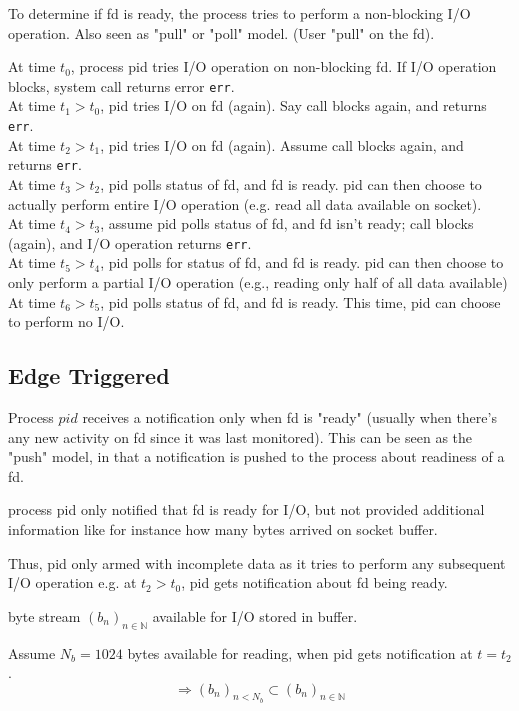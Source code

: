 \documentclass[10pt]{amsart}
\begin{document}
To determine if fd is ready, the process tries to perform a non-blocking I/O operation. Also seen as "pull" or "poll" model. (User "pull" on the fd).

At time $t_0$, process pid tries I/O operation on non-blocking fd. If I/O operation blocks, system call returns error \texttt{err}. \\
At time $t_1 > t_0$, pid tries I/O on fd (again). Say call blocks again, and returns \texttt{err}. \\
At time $t_2 > t_1$, pid tries I/O on fd (again). Assume call blocks again, and returns \texttt{err}. \\
At time $t_3 > t_2$, pid polls status of fd, and fd is ready. pid can then choose to actually perform entire I/O operation (e.g. read all data available on socket). \\
At time $t_4 > t_3$, assume pid polls status of fd, and fd isn't ready; call blocks (again), and I/O operation returns \texttt{err}. \\
At time $t_5 > t_4$, pid polls for status of fd, and fd is ready. pid can then choose to only perform a partial I/O operation (e.g., reading only half of all data available) \\
At time $t_6 > t_5$, pid polls status of fd, and fd is ready. This time, pid can choose to perform no I/O.

\subsection{Edge Triggered}

Process $pid$ receives a notification only when fd is "ready" (usually when there's any new activity on fd since it was last monitored). This can be seen as the "push" model, in that a notification is pushed to the process about readiness of a fd.

process pid only notified that fd is ready for I/O, but not provided additional information like for instance how many bytes arrived on socket buffer.

Thus, pid only armed with incomplete data as it tries to perform any subsequent I/O operation 
e.g. 
at $t_2 > t_0$, pid gets notification about fd being ready.

byte stream $(b_n)_{n\in \mathbb{N}}$ available for I/O stored in buffer.

Assume $N_b = 1024$ bytes available for reading, when pid gets notification at $t= t_2$. 
\[
\Longrightarrow (b_n)_{n <N_b} \subset (b_n)_{n\in \mathbb{N}}
\]
\end{document}

